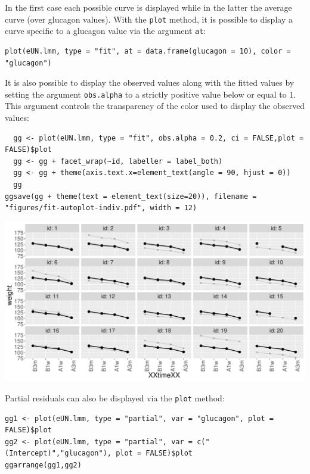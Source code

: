 \documentclass[12pt]{article}
\begin{document}
In the first case each possible curve is displayed while in the latter
the average curve (over glucagon values). With the \texttt{plot} method,
it is possible to display a curve specific to a glucagon value via the
argument \texttt{at}:
\lstset{language=r,label= ,caption= ,captionpos=b,numbers=none}
\begin{lstlisting}
plot(eUN.lmm, type = "fit", at = data.frame(glucagon = 10), color = "glucagon")
\end{lstlisting}

It is also possible to display the observed values along with the
fitted values by setting the argument \texttt{obs.alpha} to a strictly
positive value below or equal to 1. This argument controls the
transparency of the color used to display the observed values:
\lstset{language=r,label= ,caption= ,captionpos=b,numbers=none}
\begin{lstlisting}
  gg <- plot(eUN.lmm, type = "fit", obs.alpha = 0.2, ci = FALSE,plot = FALSE)$plot
  gg <- gg + facet_wrap(~id, labeller = label_both)
  gg <- gg + theme(axis.text.x=element_text(angle = 90, hjust = 0))
  gg
ggsave(gg + theme(text = element_text(size=20)), filename = "figures/fit-autoplot-indiv.pdf", width = 12)
\end{lstlisting}

\begin{center}
\includegraphics[width=\textwidth]{./figures/fit-autoplot-indiv.pdf}
\end{center}

\clearpage

Partial residuals can also be displayed via the \texttt{plot} method:
\lstset{language=r,label= ,caption= ,captionpos=b,numbers=none}
\begin{lstlisting}
gg1 <- plot(eUN.lmm, type = "partial", var = "glucagon", plot = FALSE)$plot
gg2 <- plot(eUN.lmm, type = "partial", var = c("(Intercept)","glucagon"), plot = FALSE)$plot
ggarrange(gg1,gg2)
\end{lstlisting}
\end{document}
